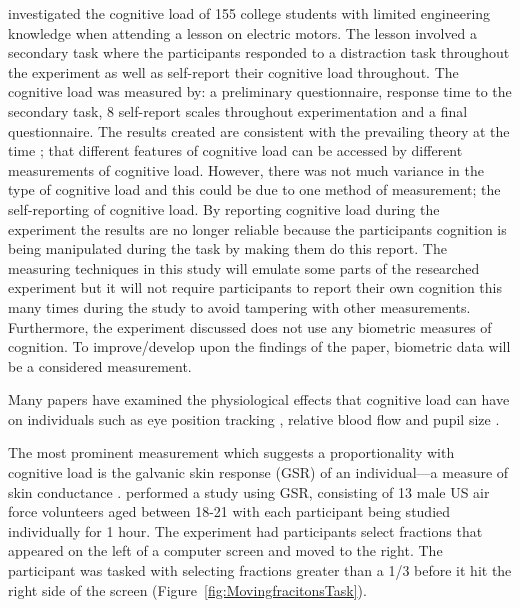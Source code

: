 \documentclass[conference]{IEEEtran}
\begin{document}
\citet{deleeuw2008comparison} investigated the cognitive load of 155 college students with limited engineering knowledge when attending a lesson on electric motors. The lesson involved a secondary task where the participants responded to a distraction task throughout the experiment as well as self-report their cognitive load throughout. The cognitive load was measured by: a preliminary questionnaire, response time to the secondary task, 8 self-report scales throughout experimentation and a final questionnaire. The results created are consistent with the prevailing theory at the time \cite{ayres2006using}; that different features of cognitive load can be accessed by different measurements of cognitive load. However, there was not much variance in the type of cognitive load and this could be due to one method of measurement; the self-reporting of cognitive load. By reporting cognitive load during the experiment the results are no longer reliable because the participants cognition is being manipulated during the task by making them do this report. The measuring techniques in this study will emulate some parts of the researched experiment but it will not require participants to report their own cognition this many times during the study to avoid tampering with other measurements. Furthermore, the experiment discussed does not use any biometric measures of cognition. To improve/develop upon the findings of the paper, biometric data will be a considered measurement.

Many papers have examined the physiological effects that cognitive load can have on individuals such as eye position tracking \cite{palinko2010estimating}, relative blood flow \cite{ikehara2005assessing} and pupil size \cite{partala2003pupil}.

The most prominent measurement which suggests a proportionality with cognitive load is the galvanic skin response (GSR) of an individual---a measure of skin conductance \cite{shi2007galvanic,nourbakhsh2012using}. \citet{ikehara2005assessing} performed a study using GSR, consisting of 13 male US air force volunteers aged between 18-21 with each participant being studied individually for 1 hour. The experiment had participants select fractions that appeared on the left of a computer screen and moved to the right. The participant was tasked with selecting fractions greater than a 1/3 before it hit the right side of the screen (Figure~\ref{fig:MovingfracitonsTask}).
\end{document}
